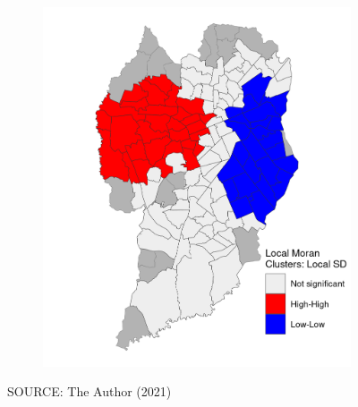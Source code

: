 \begin{figure}[!htbp]
\begin{subfigure}{0.5\textwidth}
        \includegraphics{fig/lisa_LSD_SP.png}
    \end{subfigure}    
    \label{fig:sp_sd}
    \par SOURCE: The Author (2021)
\end{figure}



